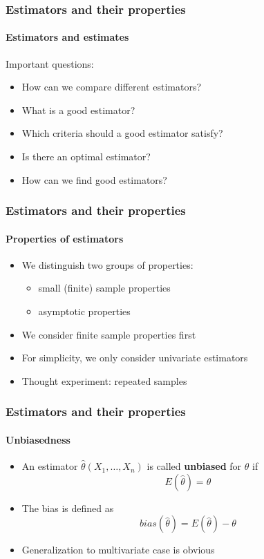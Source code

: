 \documentclass[notes=show]{beamer}
\begin{document}
\begin{frame}\frametitle{Estimators and their properties}\framesubtitle{Estimators and estimates}
Important questions:
\begin{itemize}
    \item How can we compare different estimators?
    \item What is a good estimator?
    \item Which criteria should a good estimator satisfy?
    \item Is there an optimal estimator?
    \item How can we find good estimators?
\end{itemize}
\end{frame}


\begin{frame}\frametitle{Estimators and their properties}\framesubtitle{Properties of estimators}
\begin{itemize}
    \item We distinguish two groups of properties:
    \begin{itemize}
        \item small (finite) sample properties
        \item asymptotic properties
    \end{itemize}
    \item We consider finite sample properties first
    \item For simplicity, we only consider univariate estimators
    \item Thought experiment: repeated samples
\end{itemize}
\end{frame}


\begin{frame}\frametitle{Estimators and their properties}\framesubtitle{Unbiasedness}
\begin{itemize}
    \item An estimator $\hat{\theta}(X_{1},\ldots ,X_{n})$ is called \textbf{unbiased} for $\theta $ if
    \begin{equation*}
        E\left( \hat{\theta}\right) =\theta
    \end{equation*}
    \item The bias is defined as
    \begin{equation*}
        bias(\hat{\theta})=E(\hat{\theta})-\theta
    \end{equation*}
    \item Generalization to multivariate case is obvious
\end{itemize}
\end{frame}
\end{document}
